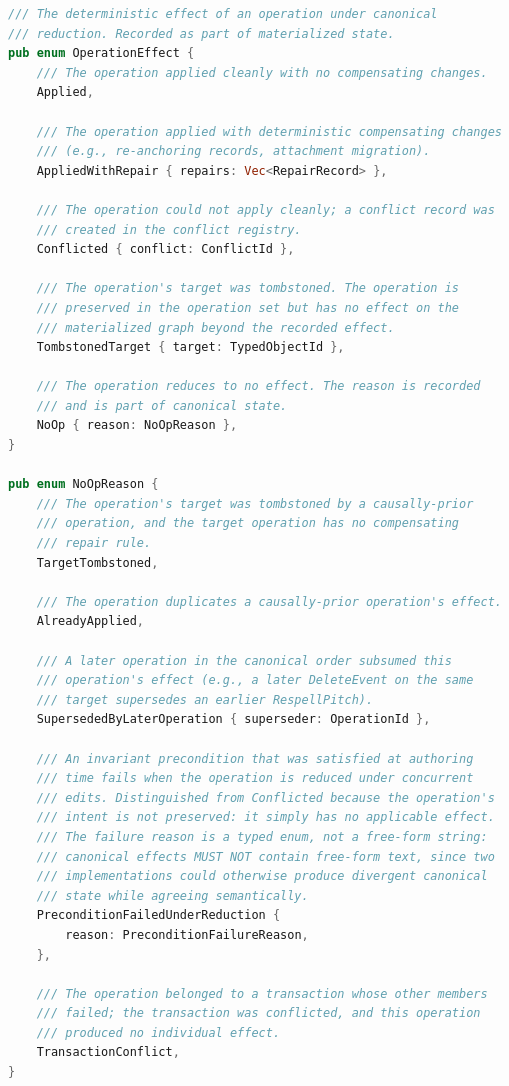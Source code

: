 \documentclass[11pt,letterpaper]{report}
\begin{document}
\begin{lstlisting}[language=Rust]
/// The deterministic effect of an operation under canonical
/// reduction. Recorded as part of materialized state.
pub enum OperationEffect {
    /// The operation applied cleanly with no compensating changes.
    Applied,

    /// The operation applied with deterministic compensating changes
    /// (e.g., re-anchoring records, attachment migration).
    AppliedWithRepair { repairs: Vec<RepairRecord> },

    /// The operation could not apply cleanly; a conflict record was
    /// created in the conflict registry.
    Conflicted { conflict: ConflictId },

    /// The operation's target was tombstoned. The operation is
    /// preserved in the operation set but has no effect on the
    /// materialized graph beyond the recorded effect.
    TombstonedTarget { target: TypedObjectId },

    /// The operation reduces to no effect. The reason is recorded
    /// and is part of canonical state.
    NoOp { reason: NoOpReason },
}

pub enum NoOpReason {
    /// The operation's target was tombstoned by a causally-prior
    /// operation, and the target operation has no compensating
    /// repair rule.
    TargetTombstoned,

    /// The operation duplicates a causally-prior operation's effect.
    AlreadyApplied,

    /// A later operation in the canonical order subsumed this
    /// operation's effect (e.g., a later DeleteEvent on the same
    /// target supersedes an earlier RespellPitch).
    SupersededByLaterOperation { superseder: OperationId },

    /// An invariant precondition that was satisfied at authoring
    /// time fails when the operation is reduced under concurrent
    /// edits. Distinguished from Conflicted because the operation's
    /// intent is not preserved: it simply has no applicable effect.
    /// The failure reason is a typed enum, not a free-form string:
    /// canonical effects MUST NOT contain free-form text, since two
    /// implementations could otherwise produce divergent canonical
    /// state while agreeing semantically.
    PreconditionFailedUnderReduction {
        reason: PreconditionFailureReason,
    },

    /// The operation belonged to a transaction whose other members
    /// failed; the transaction was conflicted, and this operation
    /// produced no individual effect.
    TransactionConflict,
}


\end{lstlisting}
\end{document}
